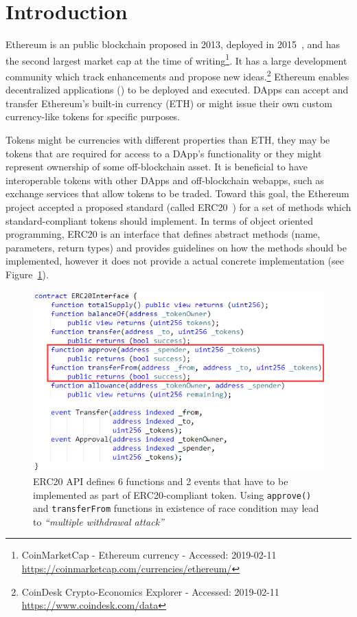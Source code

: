 
\section{Introduction}



Ethereum is an public blockchain proposed in 2013, deployed in 2015~\cite{Ref00}, and has the second largest market cap at the time of writing\footnote{CoinMarketCap - Ethereum currency - Accessed: 2019-02-11 \newline\url{https://coinmarketcap.com/currencies/ethereum/}}. It has a large development community which track enhancements and propose new ideas.\footnote{CoinDesk Crypto-Economics Explorer - Accessed: 2019-02-11 \newline\url{https://www.coindesk.com/data}} Ethereum enables decentralized applications (\dapps) to be deployed and executed. DApps can accept and transfer Ethereum's built-in currency (ETH) or might issue their own custom currency-like tokens for specific purposes.

Tokens might be currencies with different properties than ETH, they may be tokens that are required for access to a DApp's functionality or they might represent ownership of some off-blockchain asset. It is beneficial to have interoperable tokens with other DApps and off-blockchain webapps, such as exchange services that allow tokens to be traded. Toward this goal, the Ethereum project accepted a proposed standard (called ERC20~\cite{Ref08}) for a set of methods which standard-compliant tokens should implement. In terms of object oriented programming, ERC20 is an interface that defines abstract methods (name, parameters, return types) and provides guidelines on how the methods should be implemented, however it does not provide a actual concrete implementation (see Figure~\ref{fig:erc20api}). 

\begin{figure}[t!]
	\centering
	\includegraphics[width=1.0\linewidth]{figures/multiple_withdrawal_01.png}
	\caption{ERC20 API defines 6 functions and 2 events that have to be implemented as part of ERC20-compliant token. Using \texttt{approve()} and \texttt{transferFrom} functions in existence of race condition may lead to \textit{``multiple withdrawal attack''}\label{fig:erc20api}}
\end{figure}

